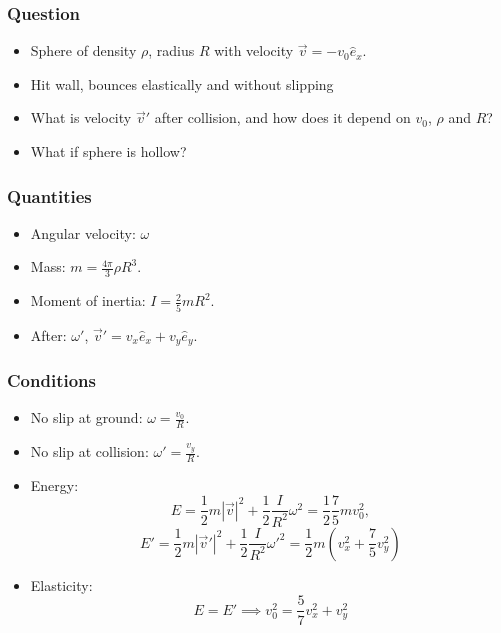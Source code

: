 \documentclass[aspectratio=169]{beamer}
\begin{document}
    \begin{frame}
        \frametitle{Question}
        \begin{itemize}
            \item Sphere of density $\rho$, radius $R$ with velocity $\vec v = - v_0 \hat e_x$.
            \item Hit wall, bounces elastically and without slipping
            \item What is velocity $\vec v'$ after collision, and how does it depend on $v_0$, $\rho$ and $R$?
            \item What if sphere is hollow?
        \end{itemize}
    \end{frame}

    \begin{frame}
        \frametitle{Quantities}
        \begin{itemize}
            \item Angular velocity: $\omega$
            \item Mass: $m = \frac{4 \pi}{3} \rho R^3$.
            \item Moment of inertia: $I = \frac{2}{5} m R^2$.
            \item After: $\omega'$, $\vec v' = v_x \hat e_x + v_y \hat e_y$.
        \end{itemize}
    \end{frame}


    \begin{frame}
        \frametitle{Conditions}
        \begin{itemize}
            \item No slip at ground: $\omega = \frac{v_0}{R}$.
            \item No slip at collision: $\omega' = \frac{v_y}{R}$.
            \item Energy:
            $$
            E = \frac{1}{2} m |\vec v|^2 + \frac{1}{2} \frac{I}{R^2} \omega^2
            = \frac{1}{2} \frac{7}{5} m v_0^2,
            $$
            $$
            E' = \frac{1}{2} m |\vec v'|^2 + \frac{1}{2} \frac{I}{R^2} \omega'^2
            = \frac{1}{2}m \left( v_x^2 + \frac{7}{5} v_y^2 \right) 
            $$
            \item Elasticity: 
            $$
                E = E' \implies
                v_0^2 = \frac{5}{7}v_x^2 + v_y^2
            $$
        \end{itemize}
    \end{frame}
\end{document}
